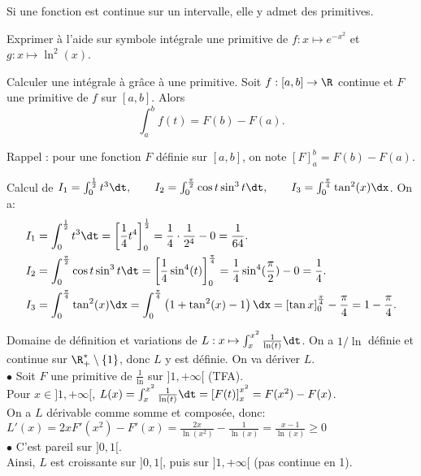 \documentclass[11pt]{article}
\begin{document}
\begin{corr}{}{}
    Si une fonction est continue sur un intervalle, elle y admet des primitives.
\end{corr}

\begin{ex}{}{}
    Exprimer à l'aide sur symbole intégrale une primitive de $f:x\mapsto e^{-x^2}$ et $g:x\mapsto\ln^2(x)$.
\end{ex}

\begin{prop}{Calculer une intégrale à grâce à une primitive.}{}
    Soit $f:[a,b]\to\R$ continue et $F$ une primitive de $f$ sur $[a,b]$. Alors
    \begin{equation*}
        \int_a^bf(t)=F(b)-F(a).
    \end{equation*}
\end{prop}

Rappel : pour une fonction $F$ définie sur $[a,b]$, on note $[F]_a^b=F(b)-F(a)$.

\begin{ex}{}{}
    Calcul de $I_1=\int_0^{\frac{1}{2}}t^3\dt, \qquad I_2=\int_0^{\frac{\pi}{2}}\cos t\sin^3 t\dt,\qquad I_3=\int_0^{\frac{\pi}{4}}\tan^2(x)\dx$.
    \tcblower
    On a:
    \begin{align*}
        &I_1=\int_0^{{\frac{1}{2}}}t^3\dt=\left[\frac{1}{4}t^4\right]_0^{\frac{1}{2}}=\frac{1}{4}\cdot\frac{1}{2^4}-0=\frac{1}{64}.\\
        &I_2=\int_0^{\frac{\pi}{2}}\cos t\sin^3t\dt=\left[ \frac{1}{4}\sin^4(t) \right]_0^{\frac{\pi}{4}}=\frac{1}{4}\sin^4(\frac{\pi}{2})-0=\frac{1}{4}.\\
        &I_3=\int_0^{\frac{\pi}{4}}\tan^2(x)\dx=\int_0^{\frac{\pi}{4}}\left( 1+\tan^2(x) - 1 \right)\dx=\left[ \tan x \right]_0^{\frac{\pi}{4}}-\frac{\pi}{4}=1-\frac{\pi}{4}.
    \end{align*}
\end{ex}

\begin{ex}{}{}
    Domaine de définition et variations de $L:x\mapsto\int_x^{x^2}\frac{1}{\ln(t)}\dt$.
    \tcblower
    On a $1/\ln$ définie et continue sur $\R_+^*\setminus\{1\}$, donc $L$ y est définie. On va dériver $L$.\\
    $\bullet$ Soit $F$ une primitive de $\frac{1}{\ln}$ sur $]1,+\infty[$ (TFA).\\
    Pour $x\in]1,+\infty[$, $L(x)=\int_x^{x^2}\frac{1}{\ln(t)}\dt=\left[ F(t) \right]_x^{x^2}=F(x^2)-F(x)$.\\
    On a $L$ dérivable comme somme et composée, donc: $L'(x)=2xF'(x^2)-F'(x)=\frac{2x}{\ln(x^2)}-\frac{1}{\ln(x)}=\frac{x-1}{\ln(x)}\geq0$\\
    $\bullet$ C'est pareil sur $]0,1[$.\\
    Ainsi, $L$ est croissante sur $]0,1[$, puis sur $]1,+\infty[$ (pas continue en 1).
\end{ex}
\end{document}
